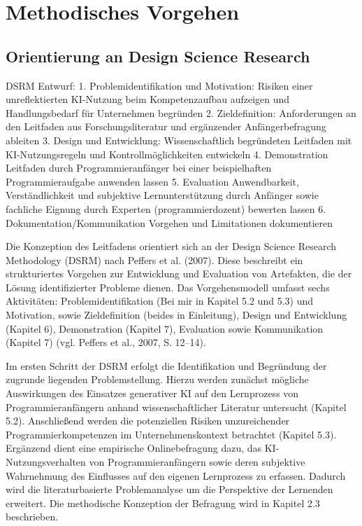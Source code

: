 \section{Methodisches Vorgehen}

\subsection{Orientierung an Design Science Research}
DSRM Entwurf:
1. Problemidentifikation und Motivation: 
    Risiken einer unreflektierten KI-Nutzung beim Kompetenzaufbau aufzeigen und Handlungsbedarf für Unternehmen begründen
2. Zieldefinition:
    Anforderungen an den Leitfaden aus Forschungsliteratur und ergänzender Anfängerbefragung ableiten
3. Design und Entwicklung:
    Wissenschaftlich begründeten Leitfaden mit KI-Nutzungsregeln und Kontrollmöglichkeiten entwickeln
4. Demonstration 
    	Leitfaden durch Programmieranfänger bei einer beispielhaften Programmieraufgabe anwenden lassen
5. Evaluation
    	Anwendbarkeit, Verständlichkeit und subjektive Lernunterstützung durch Anfänger sowie fachliche Eignung durch Experten (programmierdozent) bewerten lassen
6. Dokumentation/Kommunikation
    Vorgehen und Limitationen dokumentieren


Die Konzeption des Leitfadens orientiert sich an der Design Science Research Methodology (DSRM) nach Peffers et al. (2007). Diese beschreibt ein strukturiertes Vorgehen zur Entwicklung und Evaluation von Artefakten, die der Lösung identifizierter Probleme dienen. Das Vorgehensmodell umfasst sechs Aktivitäten: Problemidentifikation (Bei mir in Kapitel 5.2 und 5.3) und Motivation, sowie Zieldefinition (beides in Einleitung), Design und Entwicklung (Kapitel 6), Demonstration (Kapitel 7), Evaluation sowie Kommunikation (Kapitel 7) (vgl. Peffers et al., 2007, S. 12–14).

Im ersten Schritt der DSRM erfolgt die Identifikation und Begründung der zugrunde liegenden Problemstellung. Hierzu werden zunächst mögliche Auswirkungen des Einsatzes generativer KI auf den Lernprozess von Programmieranfängern anhand wissenschaftlicher Literatur untersucht (Kapitel 5.2). Anschließend werden die potenziellen Risiken unzureichender Programmierkompetenzen im Unternehmenskontext betrachtet (Kapitel 5.3).
Ergänzend dient eine empirische Onlinebefragung dazu, das KI-Nutzungsverhalten von Programmieranfängern sowie deren subjektive Wahrnehmung des Einflusses auf den eigenen Lernprozess zu erfassen. Dadurch wird die literaturbasierte Problemanalyse um die Perspektive der Lernenden erweitert. Die methodische Konzeption der Befragung wird in Kapitel 2.3 beschrieben.

